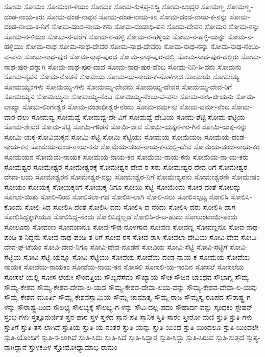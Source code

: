 ಸೋಮ
ಸೋಮಂ
ಸೋಮಂಗ-ಳಿಯಂ
ಸೋಮಕ
ಸೋಮ-ಕುಳಪ್ರ-ಸಿದ್ಧಿ
ಸೋಮ-ಚಂದ್ರರ
ಸೋಮಣ್ಣ
ಸೋಮಣ್ಣ-ದಂಡ-ನಾಯ-ಕರು
ಸೋಮ-ದಂಡ-ನಾಥನ
ಸೋಮ-ದಂಡ-ನಾಯ-ಕನ
ಸೋಮ-ದಂಡ-ನಾಯ-ಕ-ನನ್ನು
ಸೋಮ-ದಂಡ-ನಾಯ-ಕ-ನಿಗೆ
ಸೋಮ-ದಂಡ-ನಾಯ-ಕನು
ಸೋಮ-ದಂಡಾಧಿ-ಪನ
ಸೋಮ-ದೇವನ
ಸೋಮನ
ಸೋಮ-ನನ್ನು
ಸೋಮ-ನ-ಳಿಯಂ
ಸೋಮ-ನ-ವರೆಗೆ
ಸೋಮ-ನ-ಹಳ್ಳಿ
ಸೋಮ-ನ-ಹಳ್ಳಿಯ
ಸೋಮ-ನ-ಹಳ್ಳಿ-ಯನ್ನು
ಸೋಮ-ನ-ಹಳ್ಳಿಯು
ಸೋಮ-ನಾಥ
ಸೋಮ-ನಾಥ-ದೇವರ
ಸೋಮ-ನಾಥ-ದೇವರು
ಸೋಮ-ನಾಥ-ನನ್ನು
ಸೋಮ-ನಾಥ-ನೆಂಬು-ವ-ವನು
ಸೋಮ-ನಾಥ-ಪುರ
ಸೋಮ-ನಾಥ-ಪುರದ
ಸೋಮ-ನಾಥ-ಪುರ-ದಲ್ಲಿ
ಸೋಮ-ನಾಥ-ಪುರ-ದಲ್ಲಿರು
ಸೋಮ-ನಾಥ-ಪುರ-ವನ್ನಾಗಿ
ಸೋಮ-ನಾಥ-ಪುರ-ವಾದ
ಸೋಮ-ನಾಥ-ಪುರ-ವೆಂಬ
ಸೋಮ-ನಿನಿ-ಸಿ-ದನು
ಸೋಮನು
ಸೋಮ-ನೃಪನ
ಸೋಮ-ನೊಡನೆ
ಸೋಮಯ
ಸೋಮ-ಯ-ನಾಯ-ಕ-ನೊಳಗಾದ
ಸೋಮಯೆ
ಸೋಮಯ್ಯ
ಸೋಮಯ್ಯಂಗಳು
ಸೋಮಯ್ಯ-ಗಳು
ಸೋಮಯ್ಯ-ದೇವನು
ಸೋಮಯ್ಯ-ದೇವರ
ಸೋಮಯ್ಯ-ದೇವ-ರಿಗೆ
ಸೋಮಯ್ಯನ
ಸೋಮಯ್ಯನು
ಸೋಮಯ್ಯ-ನೆಂಬ
ಸೋಮಯ್ಯ-ನೆಂಬು-ವ-ವನು
ಸೋಮ-ರಾಸಿ-ಜೀಯನು
ಸೋಮ-ಲಾಖ್ಯಾ
ಸೋಮ-ಲಿಂಗೇಶ್ವರ
ಸೋಮ-ವಂಶಾಧೀಶ್ವರ-ನೆಂದು
ಸೋಮ-ವರ್ಮನು
ಸೋಮ-ವರ್ಮ-ನೆಂಬ
ಸೋಮ-ವಾರ-ದಲು
ಸೋಮವ್ವ
ಸೋಮವ್ವೆ
ಸೋಮವ್ವೆ-ದೇ-ವಿಗೆ
ಸೋಮವ್ವೆ-ದೇವಿಯ
ಸೋಮ-ಶೆಟ್ಟಿ
ಸೋಮ-ಶೆಟ್ಟಿಯ
ಸೋಮ-ಶೇಖರ
ಸೋಮ-ಸೆಟ್ಟಿ
ಸೋಮಿ-ಗೌಡನ
ಸೋಮಿ-ದೇವ
ಸೋಮಿ-ಯಕ್ಕನ-ಣು-ಗಿನ
ಸೋಮಿ-ಯಕ್ಕ-ನನ್ನು
ಸೋಮಿ-ಯಕ್ಕ-ಸೋವಿಯಕ್ಕನ
ಸೋಮಿ-ಸೆಟ್ಟಿ
ಸೋಮಿ-ಸೆಟ್ಟಿಯು
ಸೋಮೆಯ
ಸೋಮೆಯಜ
ಸೋಮೆಯ-ದಂಡ-ನಾಯ-ಕನ
ಸೋಮೆಯ-ದಂಡ-ನಾಯ-ಕನು
ಸೋಮೆಯ-ದಂಡ-ನಾಯ-ಕ-ಮಲ್ಲಿ-ದೇವ
ಸೋಮೆಯ-ದಂಡ-ನಾಯ-ಕರ
ಸೋಮೆಯನ
ಸೋಮೆಯ-ನಾಯಕ
ಸೋಮೆಯ-ನಾಯ-ಕನ
ಸೋಮೆಯ-ನಾಯ-ಕನು
ಸೋಮೆಯ-ನಾ-ಯ-ಕರು
ಸೋಮೆಶ್ವರ
ಸೋಮೇಶ್ವರ
ಸೋಮೇಶ್ವರಕ್ಕೆ
ಸೋಮೇಶ್ವರ-ದೇವ-ರ-ಸರು
ಸೋಮೇಶ್ವರ-ದೇವ-ರಿಗೆ
ಸೋಮೇಶ್ವರ-ದೇವಾ-ಲಯ
ಸೋಮೇಶ್ವರನ
ಸೋಮೇಶ್ವರ-ನನ್ನು
ಸೋಮೇಶ್ವರ-ನಿಗೆ
ಸೋಮೇಶ್ವರನು
ಸೋಮೇಶ್ವರನೇ
ಸೋಮೇಷಂ
ಸೋಯಂ
ಸೋಯಕ್ಕ
ಸೋಯಕ್ಕಂಗೆ
ಸೋಯಕ್ಕ-ನಿಗೂ
ಸೋಯಿ-ಸೆಟ್ಟಿ
ಸೋಯೆಂದು
ಸೋರ-ದಂತೆ
ಸೋಲನ್ನು
ಸೋಲಾ-ಯಿತು
ಸೋಲಿ-ನಿಂದ
ಸೋಲಿಸಲಾ-ಗದ
ಸೋಲಿಸ-ಲಾಗಿ
ಸೋಲಿ-ಸಲು
ಸೋಲಿಸಲ್ಪಟ್ಟ
ಸೋಲಿಸಿ
ಸೋಲಿಸಿ-ಕೊಂದು
ಸೋಲಿ-ಸಿದ
ಸೋಲಿಸಿ-ದಂತೆ
ಸೋಲಿಸಿ-ದನು
ಸೋಲಿಸಿ-ದ-ನೆಂದು
ಸೋಲಿಸಿ-ದರು
ಸೋಲಿಸಿ-ದಾಗ
ಸೋಲಿಸಿದ್ದಕ್ಕಾಗಿಯೂ
ಸೋಲಿಸಿದ್ದ-ನೆಂದು
ಸೋಲಿಸಿದ್ದಲ್ಲದೆ
ಸೋಲಿಸಿ-ರ-ಬ-ಹುದು
ಸೋಲುಂಟಾಯಿ-ತೆಂದು
ಸೋಲೂರು
ಸೋವಂಣ
ಸೋವಂಣನೂ
ಸೋವ-ಗೌಡ-ನೊಳಗಾದ
ಸೋವಣ
ಸೋವಣ್ಣ
ಸೋವಣ್ಣನೂ
ಸೋವ-ನಾಥ-ಪಂಡಿ-ತ-ನಿದ್ದನು
ಸೋವ-ನಾಥ-ಪಂಡಿ-ತ-ರಿಗೆ
ಸೋವ-ರಸ
ಸೋವ-ರಾಸಿ
ಸೋವಲಾ-ದೇವಿಯ
ಸೋವಿ-ದೇವ
ಸೋವಿ-ದೇವ-ಘ-ಟೆಯಂ
ಸೋವಿ-ದೇವ-ನಿಗೂ
ಸೋವಿ-ದೇವ-ನೊಡನೆ
ಸೋವಿಯ
ಸೋವಿ-ಸೆಟ್ಟಿ
ಸೋವಿ-ಸೆಟ್ಟಿಗೆ
ಸೋವಿ-ಸೆಟ್ಟಿಯ
ಸೋವಿ-ಸೆಟ್ಟಿ-ಯನ್ನೂ
ಸೋವಿ-ಸೆಟ್ಟಿಯು
ಸೋವೆಯ
ಸೋವೆಯ-ದಂಡ-ನಾಯ-ಕ-ಸೋಮೆಯ
ಸೋವೆಯ-ನಾಯಕ
ಸೋವೆಯ-ನಾಯಕಂ
ಸೋವೆಯ-ನಾಯ-ಕನ
ಸೋಸಲಿ
ಸೋಸಲಿ-ಯ-ಇಂದಿನ
ಸೋಸಲೆ
ಸೋಸಲೆಯ
ಸೋಸಲೆ-ಯಲ್ಲಿ
ಸೋಸ-ಲೆಯೇ
ಸೌಂದತ್ತಿಯ
ಸೌಖ್ಯನೆಸೆವಂ
ಸೌಖ್ಯಾಯ
ಸೌಚ
ಸೌಜನ-ಬಾಂಧವ
ಸೌಭಾಗ್ಯ
ಸೌಮ್ಯ
ಸೌಮ್ಯ-ಕೇಶವ
ಸೌಮ್ಯ-ಕೇಶವ-ದೇವಾ-ಲ-ಯದ
ಸೌಮ್ಯ-ಕೇಶವ-ದೇವಾ-ಲಯ-ವನ್ನು
ಸೌಮ್ಯ-ಕೇಶವ-ದೇವಾ-ಲ-ಯವು
ಸೌಮ್ಯ-ಕೇಶವ-ಮೂರ್ತಿ
ಸೌಮ್ಯ-ಕೇಶವಸ್ವಾಮಿಯ
ಸೌಮ್ಯ-ಜಾಮಾತೃ
ಸೌಮ್ಯ-ರಾಜ
ಸೌಮ್ಯಸ್ವ-ರೂಪದ
ಸೌರಾಷ್ಟ್ರ-ಗ-ಳನ್ನು
ಸೌರಾಷ್ಟ್ರ-ದಿಂದ
ಸೌಲಭ್ಯ
ಸೌಲಭ್ಯಕ್ಕೆ
ಸೌಲಭ್ಯ-ಗ-ಳನ್ನು
ಸೌವಿ-ದಲ್ಲ-ಪದಂ
ಸೌಹಾರ್ದ-ವನ್ನು
ಸ್ಕಂಧಕಂ
ಸ್ಟೇಷನ್
ಸ್ತಂಭ-ಗಳು
ಸ್ತತ್ಸೂನುರ್ಜಿತ
ಸ್ತನ-ಹಾರ
ಸ್ತಳ
ಸ್ತಳದ
ಸ್ತಾನ-ಪತಿ
ಸ್ತಾನಿಕ
ಸ್ತಿತಿ-ಸಾರಂ
ಸ್ತೀರೋ-ಮಣಿ
ಸ್ತುತಿ
ಸ್ತುತಿ-ಗಳು
ಸ್ತುತಿಗೆ
ಸ್ತುತಿ-ತಸ-ಲಾಗಿದೆ
ಸ್ತುತಿಯ
ಸ್ತುತಿ-ಯ-ನಂತರ
ಸ್ತುತಿ-ಯನ್ನು
ಸ್ತುತಿ-ಯಿಂದ
ಸ್ತುತಿ-ಯಿಂದಲೂ
ಸ್ತುತಿ-ಯಿಂದಲೇ
ಸ್ತುತಿ-ಯೊಂದಿಗೆ
ಸ್ತುತಿ-ಸ-ಲಾಗಿದೆ
ಸ್ತುತಿ-ಸಿದು
ಸ್ತುತಿ-ಸಿದೆ
ಸ್ತುತಿ-ಸಿದ್ದಾರೆ
ಸ್ತುತಿ-ಸಿದ್ದು
ಸ್ತುತಿ-ಸಿರುವ
ಸ್ತುತಿ-ಸುತ್ತದೆ
ಸ್ತುತ್ಯ-ನಾಗಿದ್ದಾನೆ
ಸ್ತುಳಕಪಿಳ
ಸ್ತೋಮೋಧ್ಯಾಮಾಭಿ-ರಾಮಂ
